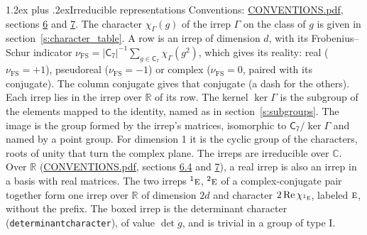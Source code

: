 \documentclass[10pt,a4paper]{article}
\makeatletter
\renewcommand\section{\@startsection{section}{1}{\z@}{-3ex plus -1ex minus -.2ex}%
  {1.2ex plus .2ex}{\normalfont\large\sffamily\bfseries\color{parttitle}}}
\numberwithin{equation}{section}
\newcommand{\grp}[1]{\mathsf{#1}}
\newcommand{\irr}[1]{\text{\normalfont\scshape #1}}
\newcommand{\conjpair}[1]{{}^{#1}}
\newcommand{\irchar}[1]{\chi_{#1}}
\newcommand{\fsind}{\nu_{\mathrm{FS}}}
\makeatother
\begin{document}
\section{Irreducible representations}\label{s:irreps}
Conventions: \href{../../CONVENTIONS.pdf}{CONVENTIONS.pdf}, sections \href{../../CONVENTIONS.pdf\#conv.6}{6} and \href{../../CONVENTIONS.pdf\#conv.7}{7}.
\leavevmode\label{n:function.character}\label{n:irrep.Gamma}The character $\irchar{\Gamma}(g)$ of the irrep $\Gamma$ on the class of $g$ is given in section~\ref{s:character_table}.
\leavevmode\label{n:index.dimension}\label{n:index.frobenius}\label{n:head.irrep}\label{n:head.reality}A row is an irrep of dimension $d$, with its Frobenius--Schur indicator $\fsind = |\grp{C_{7}}|^{-1}\allowbreak\sum_{g\in\grp{C_{7}}}\irchar{\Gamma}(g^2)$, which gives its reality: real ($\fsind = +1$), pseudoreal ($\fsind = -1$) or complex ($\fsind = 0$, paired with its conjugate). \label{n:head.conjugate}The column conjugate gives that conjugate (a dash for the others). \label{n:head.over.real}Each irrep lies in the irrep over $\mathbb{R}$ of its row. \label{n:head.kernel}The kernel $\ker\Gamma$ is the subgroup of the elements mapped to the identity, named as in section~\ref{s:subgroups}. \label{n:head.image}The image is the group formed by the irrep's matrices, isomorphic to $\grp{C_{7}}/\ker\Gamma$ and named by a point group. For dimension 1 it is the cyclic group of the characters, roots of unity that turn the complex plane. The irreps are irreducible over $\mathbb{C}$. Over $\mathbb{R}$ (\href{../../CONVENTIONS.pdf}{CONVENTIONS.pdf}, sections \href{../../CONVENTIONS.pdf\#conv.6.4}{6.4} and \href{../../CONVENTIONS.pdf\#conv.7}{7}), a real irrep is also an irrep in a basis with real matrices. The two irreps $\conjpair{1}\irr{e}$, $\conjpair{2}\irr{e}$ of a complex-conjugate pair together form one irrep over $\mathbb{R}$ of dimension $2d$ and character $2\operatorname{Re}\irchar{\conjpair{1}\irr{e}}$, labeled $\irr{e}$, without the prefix. \label{n:mark.determinant}The boxed irrep is the determinant character (\texttt{determinantcharacter}), of value $\det g$, and is trivial in a group of type I.
\setlength{\emergencystretch}{2em}\par\setlength{\emergencystretch}{0pt}
\end{document}
